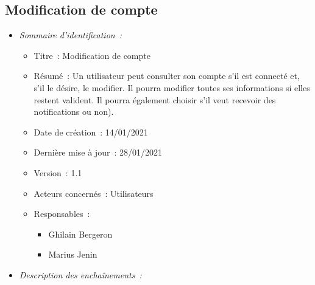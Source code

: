 \subsection{Modification de compte}\label{subsec:modification-de-compte}

\begin{itemize}

\item \textit{Sommaire d'identification~:}

    \begin{itemize}
    
    \item Titre~: Modification de compte
    
    \item Résumé~: Un utilisateur peut consulter son compte s'il est connecté et, s'il le désire, le modifier. 
    Il pourra modifier toutes ses informations si elles restent valident.
    Il pourra également choisir s'il veut recevoir des notifications ou non).
    
    \item Date de création~: 14/01/2021
    
    \item Dernière mise à jour~: 28/01/2021
    
    \item Version~: 1.1
    
    \item Acteurs concernés~: Utilisateurs
    
    \item Responsables~:
    
        \begin{itemize}
            \item Ghilain Bergeron
            \item Marius Jenin
        \end{itemize}
    
    \end{itemize}

\item \textit{Description des enchaînements~:}


\end{itemize}
